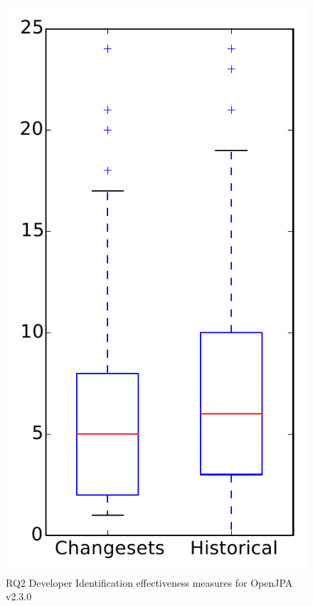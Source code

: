 
\begin{figure}
\centering
\includegraphics[height=0.4\textheight]{figures/dit/rq2_openjpa}
\caption{RQ2 Developer Identification effectiveness measures for OpenJPA v2.3.0}
\label{fig:dit:rq2:openjpa}
\end{figure}
